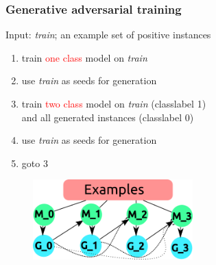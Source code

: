 \documentclass{beamer}
\newcommand{\red}[1]{\textcolor{red}{#1}}
\begin{document}
\begin{frame}
    \frametitle{Generative adversarial training}
    Input: \emph{train}; an example set of positive instances
    \begin{enumerate}

        \item train \red{one class} model on \emph{train}
        \item use \emph{train} as seeds for generation
        \item train \red{two class} model on \emph{train} (classlabel 1) \\
            and all generated instances (classlabel 0)
        \item use \emph{train} as seeds for generation
        \item goto 3
    \end{enumerate}
    \begin{figure}[ht]
        \centering
        \includegraphics[width=0.55\textwidth]{images/gat.png}
    \end{figure}
\end{frame}


\end{document}
